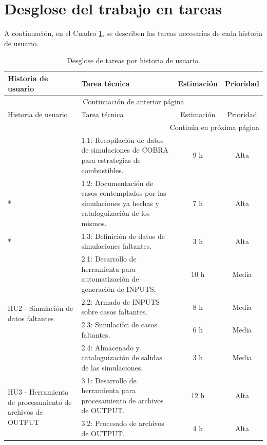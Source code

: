 \documentclass[
11pt, %
]{charter}
\begin{document}
\newpage
\section{Desglose del trabajo en tareas}
\label{sec:wbs}

A continuación, en el Cuadro \ref{tab:tareas_por_hu}, se describen las tareas necesarias de cada historia de usuario.

\begin{longtable}{|p{4cm}|p{6cm}|c|c|}
\caption{Desglose de tareas por historia de usuario.}
\label{tab:tareas_por_hu} \\
\hline
\rowcolor[HTML]{C0C0C0}
Historia de usuario & Tarea técnica & Estimación & Prioridad \\ \hline \endfirsthead
\multicolumn{4}{c}{{Continuación de anterior página}} \\
\rowcolor[HTML]{C0C0C0}
Historia de usuario & Tarea técnica & Estimación & Prioridad \\ \hline
\endhead
\hline \multicolumn{4}{|r|}{{Continúa en próxima página}} \\ \hline
\endfoot
\hline \hline
\endlastfoot

\multirow{3}{4cm}{HU1 - Determinación del set de datos}  
  & 1.1: Recopilación de datos de simulaciones de COBRA para estrategias de combustibles. & 9 h & Alta \\* \cline{2-4}
  \nopagebreak & 1.2: Documentación de casos contemplados por las simulaciones ya hechas y cataloguización de los mismos. & 7 h & Alta \\* \cline{2-4}
  & 1.3: Definición de datos de simulaciones faltantes. & 3 h & Alta \\ \hline

\multirow{4}{4cm}{HU2 - Simulación de datos faltantes}  
  & 2.1: Desarrollo de herramienta para automatización de generación de INPUTS. & 10 h & Media \\* \cline{2-4}
  & 2.2: Armado de INPUTS sobre casos faltantes. & 8 h & Media \\* \cline{2-4}
  & 2.3: Simulación de casos faltantes. & 6 h & Media \\* \cline{2-4}
  & 2.4: Almacenado y cataloguización de salidas de las simulaciones. & 3 h & Media \\ \hline

\multirow{2}{4cm}{HU3 - Herramienta de procesamiento de archivos de OUTPUT}  
  & 3.1: Desarrollo de herramienta para procesamiento de archivos de OUTPUT. & 12 h & Alta \\* \cline{2-4}
  & 3.2: Procesado de archivos de OUTPUT. & 4 h & Alta \\ \hline


\end{longtable}
\end{document}
